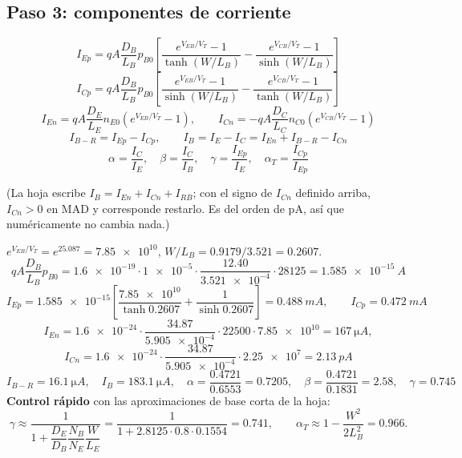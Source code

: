 \documentclass[11pt,a4paper]{article}
\newcommand{\aT}{\alpha_T}
\newcommand{\eVEB}{\left(e^{V_{EB}/V_T}-1\right)}
\newcommand{\eVCB}{\left(e^{V_{CB}/V_T}-1\right)}
\begin{document}
\subsection*{Paso 3: componentes de corriente}
\begin{clave}
\[
  I_{Ep}=qA\frac{D_B}{L_B}p_{B0}\left[\frac{e^{V_{EB}/V_T}-1}{\tanh(W/L_B)}-\frac{e^{V_{CB}/V_T}-1}{\sinh(W/L_B)}\right]
\]
\[
  I_{Cp}=qA\frac{D_B}{L_B}p_{B0}\left[\frac{e^{V_{EB}/V_T}-1}{\sinh(W/L_B)}-\frac{e^{V_{CB}/V_T}-1}{\tanh(W/L_B)}\right]
\]
\[
  I_{En}=qA\frac{D_E}{L_E}n_{E0}\eVEB,\qquad
  I_{Cn}=-qA\frac{D_C}{L_C}n_{C0}\eVCB
\]
\[
  I_{B-R}=I_{Ep}-I_{Cp},\qquad I_B=I_E-I_C=I_{En}+I_{B-R}-I_{Cn}
\]
\[
  \alpha=\frac{I_C}{I_E},\quad \beta=\frac{I_C}{I_B},\quad \gamma=\frac{I_{Ep}}{I_E},\quad \aT=\frac{I_{Cp}}{I_{Ep}}
\]
\end{clave}
(La hoja escribe $I_B=I_{En}+I_{Cn}+I_{RB}$; con el signo de $I_{Cn}$ definido arriba, $I_{Cn}>0$
en MAD y corresponde restarlo. Es del orden de pA, así que numéricamente no cambia nada.)

\begin{ejemplo}[cálculo detallado para $V_{EB}=\SI{0.648}{V}$, $V_{CB}=\SI{-2}{V}$]
$e^{V_{EB}/V_T}=e^{25.087}=\num{7.85e10}$, \quad $W/L_B=0.9179/3.521=0.2607$.
\[
  qA\frac{D_B}{L_B}p_{B0}=\num{1.6e-19}\cdot\num{1e-5}\cdot\frac{12.40}{\num{3.521e-4}}\cdot28125
  =\SI{1.585e-15}{A}
\]
\[
  I_{Ep}=\num{1.585e-15}\left[\frac{\num{7.85e10}}{\tanh 0.2607}+\frac{1}{\sinh 0.2607}\right]
  =\SI{0.488}{mA},\qquad I_{Cp}=\SI{0.472}{mA}
\]
\[
  I_{En}=\num{1.6e-24}\cdot\frac{34.87}{\num{5.905e-4}}\cdot22500\cdot\num{7.85e10}=\SI{167}{\micro A},
\]
\[
  I_{Cn}=\num{1.6e-24}\cdot\frac{34.87}{\num{5.905e-4}}\cdot\num{2.25e7}=\SI{2.13}{pA}
\]
\[
  I_{B-R}=\SI{16.1}{\micro A},\quad I_B=\SI{183.1}{\micro A},\quad
  \alpha=\frac{0.4721}{0.6553}=0.7205,\quad \beta=\frac{0.4721}{0.1831}=2.58,\quad \gamma=0.745
\]
\textbf{Control rápido} con las aproximaciones de base corta de la hoja:
\[
  \gamma\approx\frac{1}{1+\dfrac{D_E}{D_B}\dfrac{N_B}{N_E}\dfrac{W}{L_E}}
  =\frac{1}{1+2.8125\cdot0.8\cdot0.1554}=0.741,\qquad
  \aT\approx1-\frac{W^2}{2L_B^2}=0.966 .
\]
\end{ejemplo}
\end{document}

